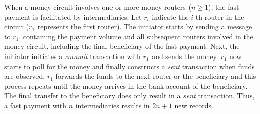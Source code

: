 When a money circuit involves one or more money routers ($ n \geq 1 $), the fast payment is facilitated by intermediaries.
Let $ r_i $ indicate the $ i $-th router in the circuit ($ r_1 $ represents the first router).
The initiator starts by sending a message to $ r_1 $, containing the payment volume and all subsequent routers involved in the money circuit, including the final beneficiary of the fast payment.
Next, the initiator initiates a \emph{commit} transaction with $ r_1 $ and sends the money.
$ r_1 $ now starts to poll for the money and finally constructs a \emph{sent} transaction when funds are observed.
$ r_1 $ forwards the funds to the next router or the beneficiary and this process repeats until the money arrives in the bank account of the beneficiary.
The final transfer to the beneficiary does only result in a \emph{sent} transaction.
Thus, a fast payment with $ n $ intermediaries results in $ 2n+1 $ new records.


